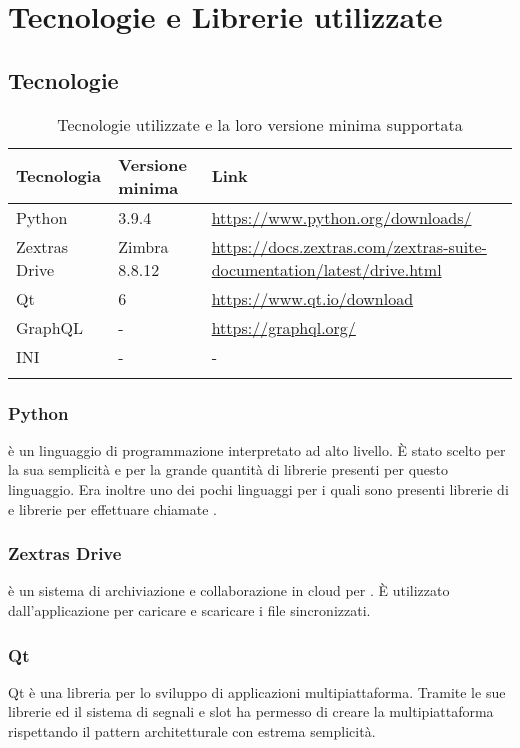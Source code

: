 \section{Tecnologie e Librerie utilizzate}
\subsection{Tecnologie}
{
	\setlength{\freewidth}{\dimexpr\textwidth-1\tabcolsep}
	\renewcommand{\arraystretch}{1.5}
	\setlength{\aboverulesep}{0pt}
	\setlength{\belowrulesep}{0pt}
	\begin{longtable}{L{.15\freewidth} L{.20\freewidth} L{.60\freewidth}}
		\textbf{Tecnologia} & \textbf{Versione minima} & \textbf{Link}\\
		\toprule
		\endhead	
		Python & 3.9.4 & \url{https://www.python.org/downloads/}\\
		Zextras Drive & Zimbra 8.8.12 &  \url{https://docs.zextras.com/zextras-suite-documentation/latest/drive.html}\\	
		Qt & 6 & \url{https://www.qt.io/download}\\
		GraphQL & - & \url{https://graphql.org/} \\
		INI & - & -\\
		\bottomrule
		\hiderowcolors
		\caption{Tecnologie utilizzate e la loro versione minima supportata}
	\end{longtable}
\subsubsection{Python}
 è un linguaggio di programmazione interpretato ad alto livello. È stato scelto per la sua semplicità e per la grande quantità di librerie presenti per questo linguaggio. Era inoltre uno dei pochi linguaggi per i quali sono presenti librerie di  e librerie per effettuare chiamate .
\subsubsection{Zextras Drive}
 è un sistema di archiviazione e collaborazione in cloud per . È utilizzato dall'applicazione per caricare e scaricare i file sincronizzati.
\subsubsection{Qt}
Qt è una libreria per lo sviluppo di applicazioni multipiattaforma. Tramite le sue librerie ed il sistema di segnali e slot ha permesso di creare la  multipiattaforma rispettando il pattern architetturale  con estrema semplicità.
}
